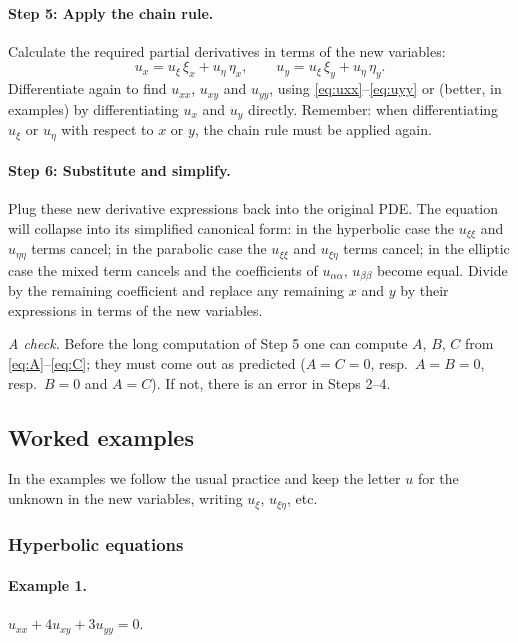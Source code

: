 \documentclass[11pt]{article}
\theoremstyle{plain}
\theoremstyle{definition}
\theoremstyle{remark}
\begin{document}
\paragraph{Step 5: Apply the chain rule.} Calculate the required partial derivatives in terms of the new variables:
$$ u_x = u_\xi\,\xi_x + u_\eta\,\eta_x, \qquad u_y = u_\xi\,\xi_y + u_\eta\,\eta_y. $$
Differentiate again to find $u_{xx}$, $u_{xy}$ and $u_{yy}$, using \eqref{eq:uxx}--\eqref{eq:uyy} or (better, in examples) by differentiating $u_x$ and $u_y$ directly. Remember: when differentiating $u_\xi$ or $u_\eta$ with respect to $x$ or $y$, the chain rule must be applied again.

\paragraph{Step 6: Substitute and simplify.} Plug these new derivative expressions back into the original PDE. The equation will collapse into its simplified canonical form: in the hyperbolic case the $u_{\xi\xi}$ and $u_{\eta\eta}$ terms cancel; in the parabolic case the $u_{\xi\xi}$ and $u_{\xi\eta}$ terms cancel; in the elliptic case the mixed term cancels and the coefficients of $u_{\alpha\alpha}$, $u_{\beta\beta}$ become equal. Divide by the remaining coefficient and replace any remaining $x$ and $y$ by their expressions in terms of the new variables.

\emph{A check.} Before the long computation of Step 5 one can compute $A$, $B$, $C$ from \eqref{eq:A}--\eqref{eq:C}; they must come out as predicted ($A = C = 0$, resp.\ $A = B = 0$, resp.\ $B = 0$ and $A = C$). If not, there is an error in Steps 2--4.

\subsection{Worked examples}

In the examples we follow the usual practice and keep the letter $u$ for the unknown in the new variables, writing $u_\xi$, $u_{\xi\eta}$, etc.

\subsubsection{Hyperbolic equations}

\paragraph{Example 1.} $u_{xx} + 4u_{xy} + 3u_{yy} = 0$.
\end{document}
